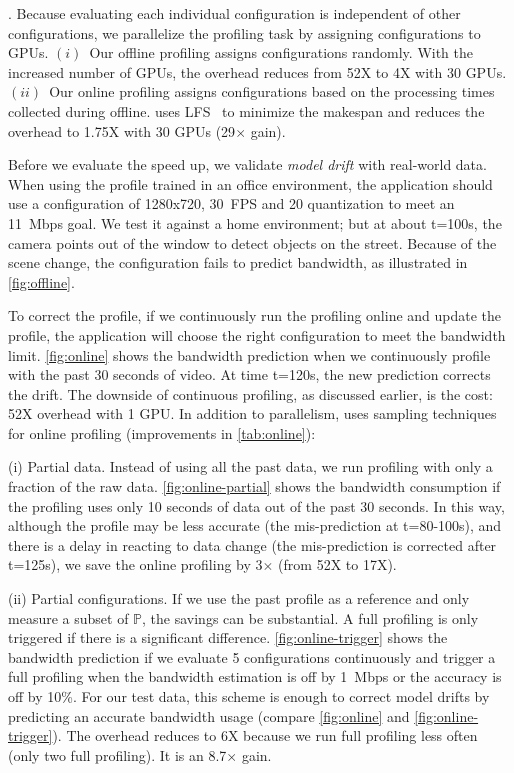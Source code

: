 . Because
evaluating each individual configuration is independent of other configurations,
we parallelize the profiling task by assigning configurations to GPUs.
$(i)$~Our offline profiling assigns configurations randomly.  With the increased
number of GPUs, the overhead reduces from 52X to 4X with 30 GPUs.  $(ii)$~Our
online profiling assigns configurations based on the processing times collected
during offline.  \awstream{} uses LFS~\cite{karger2010scheduling} to minimize the
makespan and reduces the overhead to 1.75X with 30 GPUs (29$\times$ gain).

  Before we evaluate the speed up, we validate
\textit{model drift} with real-world data. When using the profile trained in an
office environment, the application should use a configuration of 1280x720,
\SI{30}{FPS} and 20 quantization to meet an \SI{11}{Mbps} goal. We test it
against a home environment; but at about t=100s, the camera points out of the
window to detect objects on the street. Because of the scene change, the
configuration fails to predict bandwidth, as illustrated in
\autoref{fig:offline}.

To correct the profile, if we continuously run the profiling online and update
the profile, the application will choose the right configuration to meet the
bandwidth limit.  \autoref{fig:online} shows the bandwidth prediction when we
continuously profile with the past 30 seconds of video. At time t=120s, the new
prediction corrects the drift. The downside of continuous profiling, as
discussed earlier, is the cost: 52X overhead with 1 GPU\@. In addition to
parallelism, \awstream{} uses sampling techniques for online profiling
(improvements in \autoref{tab:online}):

(i) Partial data. Instead of using all the past data, we run profiling with only
a fraction of the raw data.  \autoref{fig:online-partial} shows the bandwidth
consumption if the profiling uses only 10 seconds of data out of the past 30
seconds. In this way, although the profile may be less accurate (the
mis-prediction at t=80-100s), and there is a delay in reacting to data change
(the mis-prediction is corrected after t=125s), we save the online profiling by
3$\times$ (from 52X to 17X).

(ii) Partial configurations. If we use the past profile as a reference and only
measure a subset of $\mathbb{P}$, the savings can be substantial. A full
profiling is only triggered if there is a significant
difference. \autoref{fig:online-trigger} shows the bandwidth prediction if we
evaluate 5 configurations continuously and trigger a full profiling when the
bandwidth estimation is off by \SI{1}{Mbps} or the accuracy is off by 10\%.  For
our test data, this scheme is enough to correct model drifts by predicting an
accurate bandwidth usage (compare \autoref{fig:online} and
\autoref{fig:online-trigger}).  The overhead reduces to 6X because we run full
profiling less often (only two full profiling). It is an 8.7$\times$ gain.

